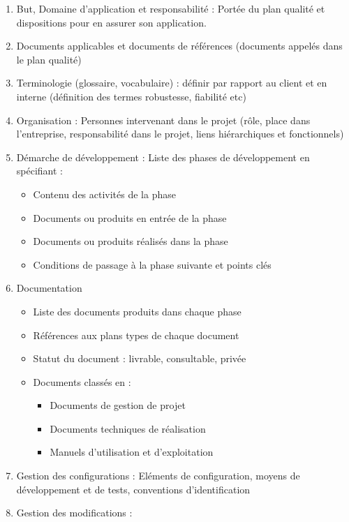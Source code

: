 \begin{enumerate}
	\item But, Domaine d'application et responsabilité : Portée du plan qualité et dispositions pour en assurer son application.
	\item Documents applicables et documents de références (documents appelés dans le plan qualité)
	\item Terminologie (glossaire, vocabulaire) : définir par rapport au client et en interne (définition des termes robustesse, fiabilité etc)
	\item Organisation : Personnes intervenant dans le projet (rôle, place dans l'entreprise, responsabilité dans le projet, liens hiérarchiques et fonctionnels)
	\item Démarche de développement : Liste des phases de développement en spécifiant :
	\begin{itemize}
		\item Contenu des activités de la phase
		\item Documents ou produits en entrée de la phase
		\item Documents ou produits réalisés dans la phase
		\item Conditions de passage à la phase suivante et points clés
	\end{itemize}
	\item Documentation
	\begin{itemize}
		\item Liste des documents produits dans chaque phase
		\item Références aux plans types de chaque document
		\item Statut du document : livrable, consultable, privée
		\item Documents classés en :
		\begin{itemize}
			\item Documents de gestion de projet
			\item Documents techniques de réalisation
			\item Manuels d'utilisation et d'exploitation
		\end{itemize}
	\end{itemize}
	\item Gestion des configurations : Eléments de configuration, moyens de développement et de tests, conventions d'identification
	\item Gestion des modifications :
	\begin{itemize}

\end{itemize}
\end{enumerate}
